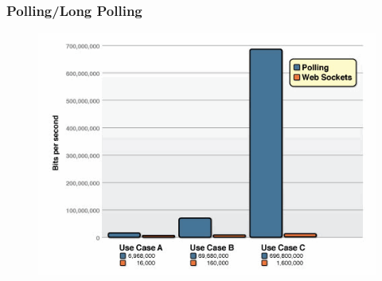 \documentclass{beamer}
\begin{document}
\begin{frame}
\frametitle{Polling/Long Polling}
\begin{figure}
\end{figure}
\end{frame}

\begin{frame}
\begin{figure}
\begin{center}
\includegraphics[width=12cm]{poll-ws-compare.png}
\end{center}
\end{figure}
\end{frame}
\end{document}
